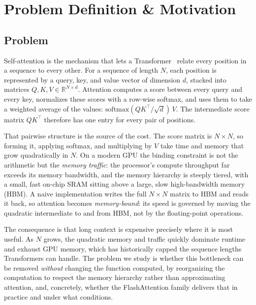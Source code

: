 \documentclass[sigconf,nonacm]{acmart}
\begin{document}
\section{Problem Definition \& Motivation}
\label{sec:problem}

\subsection{Problem}
Self-attention is the mechanism that lets a Transformer~\cite{vaswani2017attention}
relate every position in a sequence to every other. For a sequence of length $N$,
each position is represented by a query, key, and value vector of dimension $d$,
stacked into matrices $Q,K,V \in \mathbb{R}^{N\times d}$. Attention computes a
score between every query and every key, normalizes these scores with a row-wise
softmax, and uses them to take a weighted average of the values:
$\mathrm{softmax}(QK^\top/\sqrt{d})\,V$. The intermediate score matrix $QK^\top$
therefore has one entry for every pair of positions.

That pairwise structure is the source of the cost. The score matrix is
$N\times N$, so forming it, applying softmax, and multiplying by $V$ take time and
memory that grow quadratically in $N$. On a modern GPU the binding constraint is
not the arithmetic but the \emph{memory traffic}: the processor's compute
throughput far exceeds its memory bandwidth, and the memory hierarchy is steeply
tiered, with a small, fast on-chip SRAM sitting above a large, slow
high-bandwidth memory (HBM). A naive implementation writes the full $N\times N$
matrix to HBM and reads it back, so attention becomes \emph{memory-bound}: its
speed is governed by moving the quadratic intermediate to and from HBM, not by
the floating-point operations.

The consequence is that long context is expensive precisely where it is most
useful. As $N$ grows, the quadratic memory and traffic quickly dominate runtime
and exhaust GPU memory, which has historically capped the sequence lengths
Transformers can handle. The problem we study is whether this bottleneck can be
removed \emph{without} changing the function computed, by reorganizing the
computation to respect the memory hierarchy rather than approximating attention,
and, concretely, whether the FlashAttention family delivers that in practice and
under what conditions.
\end{document}
